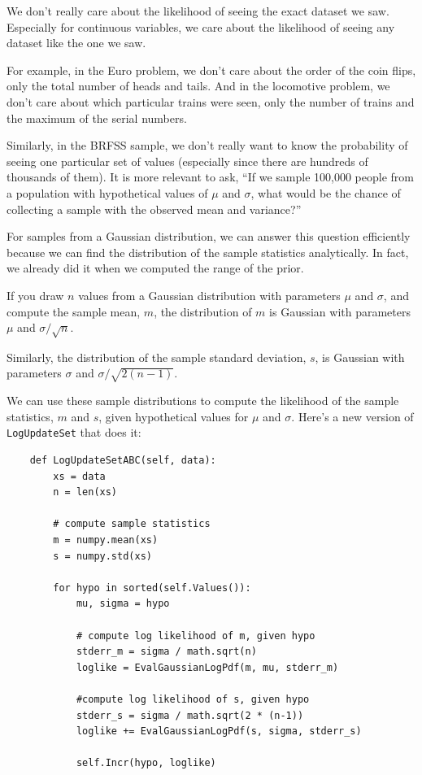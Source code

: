 \documentclass[12pt]{book}
\begin{document}
We don't really care about the likelihood of seeing the exact dataset
we saw.  Especially for continuous variables, we care about the
likelihood of seeing any dataset like the one we saw.

For example, in the Euro problem, we don't care about the order of
the coin flips, only the total number of heads and tails.  And in
the locomotive problem, we don't care about which particular trains were
seen, only the number of trains and the maximum of the serial numbers.

Similarly, in the BRFSS sample, we don't really want to know the
probability of seeing one particular set of values (especially since
there are hundreds of thousands of them).  It is more
relevant to ask, ``If we sample 100,000 people from a population
with hypothetical values of $\mu$ and $\sigma$, what would be
the chance of collecting a sample with the observed mean and
variance?''

For samples from a Gaussian distribution, we can answer this question
efficiently because we can find the distribution of the sample
statistics analytically.  In fact, we already did it when we computed
the range of the prior.

If you draw $n$ values from a Gaussian distribution with parameters
$\mu$ and $\sigma$, and compute the sample mean, $m$, the
distribution of $m$ is Gaussian
with parameters $\mu$ and $\sigma / \sqrt{n}$.

Similarly, the distribution of the sample standard deviation, $s$, is
Gaussian with parameters $\sigma$ and $\sigma / \sqrt{2 (n-1)}$.

We can use these sample distributions to compute the likelihood of the
sample statistics, $m$ and $s$, given hypothetical values
for $\mu$ and $\sigma$.  Here's a new version of \verb"LogUpdateSet"
that does it:

\begin{verbatim}
    def LogUpdateSetABC(self, data):
        xs = data
        n = len(xs)

        # compute sample statistics
        m = numpy.mean(xs)
        s = numpy.std(xs)

        for hypo in sorted(self.Values()):
            mu, sigma = hypo

            # compute log likelihood of m, given hypo
            stderr_m = sigma / math.sqrt(n)
            loglike = EvalGaussianLogPdf(m, mu, stderr_m)

            #compute log likelihood of s, given hypo
            stderr_s = sigma / math.sqrt(2 * (n-1))
            loglike += EvalGaussianLogPdf(s, sigma, stderr_s)

            self.Incr(hypo, loglike)
\end{verbatim}
\end{document}
